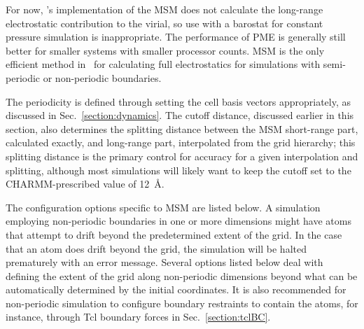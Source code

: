 For now, \NAMD's implementation of the MSM
does not calculate the long-range electrostatic 
contribution to the virial, so use with a barostat for 
constant pressure simulation is inappropriate. 
The performance of PME is generally still better for smaller systems 
with smaller processor counts. 
MSM is the only efficient method in \NAMD\ for calculating 
full electrostatics for simulations with semi-periodic or
non-periodic boundaries. 

The periodicity is defined through setting the cell basis vectors 
appropriately, as discussed in Sec.~\ref{section:dynamics}. 
The cutoff distance, discussed earlier in this section, 
also determines the splitting distance between the 
MSM short-range part, calculated exactly, and long-range part, 
interpolated from the grid hierarchy; 
this splitting distance is the primary control for 
accuracy for a given interpolation and splitting, 
although most simulations will likely want to keep the 
cutoff set to the CHARMM-prescribed value of 12~\AA. 

The configuration options specific to MSM are listed below. 
A simulation employing non-periodic boundaries in one or more 
dimensions might have atoms that attempt to drift beyond
the predetermined extent of the grid. 
In the case that an atom does drift beyond the grid, 
the simulation will be halted prematurely with an error message. 
Several options listed below deal with defining the extent of the 
grid along non-periodic dimensions beyond what can be automatically 
determined by the initial coordinates. 
It is also recommended for non-periodic simulation to 
configure boundary restraints to contain the atoms, for instance,
through Tcl boundary forces in Sec.~\ref{section:tclBC}. 


